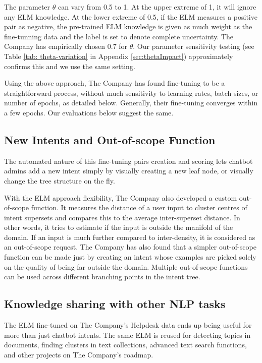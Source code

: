 \documentclass[sigconf, anonymous=true]{acmart}
\begin{document}
The parameter $\theta$ can vary from 0.5 to 1. At the upper extreme of 1, it will ignore any ELM knowledge. At the lower extreme of 0.5, if the ELM measures a positive pair as negative, the pre-trained ELM knowledge is given as much weight as the fine-tunning data and the label is set to denote complete uncertainty. The Company has empirically chosen 0.7 for $\theta$. Our parameter sensitivity testing (see Table \ref{tab: theta-variation} in Appendix \ref{sec:thetaImpact}) approximately confirms this and we use the same setting. 

Using the above approach, The Company has found fine-tuning to be a straightforward process, without much sensitivity to learning rates, batch sizes, or number of epochs, as detailed below. Generally, their fine-tuning converges within a few epochs. Our evaluations below suggest the same.

\subsection{New Intents and Out-of-scope Function}
The automated nature of this fine-tuning pairs creation and scoring lets chatbot admins add a new intent simply by visually creating a new leaf node, or visually change the tree structure on the fly.  

With the ELM approach flexibility, The Company also developed a custom out-of-scope function. It measures the distance of a user input to cluster centres of intent supersets and compares this to the average inter-superset distance. In other words, it tries to estimate if the input is outside the manifold of the domain. If an input is much further compared to inter-density, it is considered as an out-of-scope request. The Company has also found that a simpler out-of-scope function can be made just by creating an intent whose examples are picked solely on the quality of being far outside the domain. Multiple out-of-scope functions can be used across different branching points in the intent tree. 

\subsection{Knowledge sharing with other NLP tasks} The ELM fine-tuned on The Company's Helpdesk data ends up being useful for more than just chatbot intents. The same ELM is reused for detecting topics in documents, finding clusters in text collections, advanced text search functions, and other projects on The Company's roadmap.  
\end{document}

